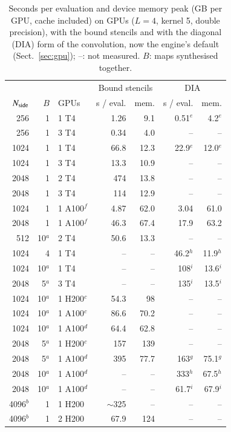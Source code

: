 \documentclass{aa}
\newcommand{\nside}{N_{\rm side}}
\begin{document}
\begin{table}
\caption{Seconds per evaluation and device memory peak (GB per GPU, cache included) on GPUs ($L=4$, kernel 5, double precision), with the bound stencils and with the diagonal (DIA) form of the convolution, now the engine's default (Sect.~\ref{sec:gpu}); --: not measured. $B$: maps synthesised together.}
\label{tab:gpu}
\centering\small
\setlength{\tabcolsep}{4pt}
\begin{tabular}{rrlrrrr}
\hline\hline
 & & & \multicolumn{2}{c}{Bound stencils} & \multicolumn{2}{c}{DIA} \\
$\nside$ & $B$ & GPUs & s / eval. & mem. & s / eval. & mem. \\
\hline
256 & 1 & 1 T4 & 1.26 & 9.1 & 0.51$^e$ & 4.2$^e$ \\
256 & 1 & 3 T4 & 0.34 & 4.0 & -- & -- \\
1024 & 1 & 1 T4 & 66.8 & 12.3 & 22.9$^e$ & 12.0$^e$ \\
1024 & 1 & 3 T4 & 13.3 & 10.9 & -- & -- \\
2048 & 1 & 2 T4 & 474 & 13.8 & -- & -- \\
2048 & 1 & 3 T4 & 114 & 12.9 & -- & -- \\
1024 & 1 & 1 A100$^f$ & 4.87 & 62.0 & 3.04 & 61.0 \\
2048 & 1 & 1 A100$^f$ & 46.3 & 67.4 & 17.9 & 63.2 \\
512 & 10$^a$ & 2 T4 & 50.6 & 13.3 & -- & -- \\
1024 & 4 & 1 T4 & -- & -- & 46.2$^h$ & 11.9$^h$ \\
1024 & 10$^a$ & 1 T4 & -- & -- & 108$^i$ & 13.6$^i$ \\
2048 & 5$^a$ & 3 T4 & -- & -- & 135$^i$ & 13.5$^i$ \\
1024 & 10$^a$ & 1 H200$^c$ & 54.3 & 98 & -- & -- \\
1024 & 10$^a$ & 1 A100$^c$ & 86.6 & 70.2 & -- & -- \\
1024 & 10$^a$ & 1 A100$^d$ & 64.4 & 62.8 & -- & -- \\
2048 & 5$^a$ & 1 H200$^c$ & 157 & 139 & -- & -- \\
2048 & 5$^a$ & 1 A100$^d$ & 395 & 77.7 & 163$^g$ & 75.1$^g$ \\
2048 & 10$^a$ & 1 A100$^d$ & -- & -- & 333$^h$ & 67.5$^h$ \\
2048 & 10$^a$ & 1 A100$^d$ & -- & -- & 61.7$^i$ & 67.9$^i$ \\
4096$^b$ & 1 & 1 H200 & $\sim$325 & -- & -- & -- \\
4096$^b$ & 1 & 2 H200 & 67.9 & 124 & -- & -- \\

\end{tabular}
\end{table}
\end{document}
